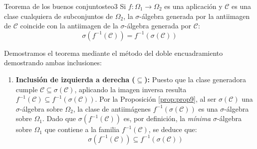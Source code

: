 \begin{teorema}{Teorema de los buenos conjuntos}{teo3}
Si $f: \Omega_1 \to \Omega_2$ es una aplicación y $\mathcal{C}$ es una clase cualquiera de subconjuntos de $\Omega_2$, la $\sigma$-álgebra generada por la antiimagen de $\mathcal{C}$ coincide con la antiimagen de la $\sigma$-álgebra generada por $\mathcal{C}$:
\[
    \sigma(f^{-1}(\mathcal{C})) = f^{-1}(\sigma(\mathcal{C}))
\]
\end{teorema}

\begin{demostracion}
Demostramos el teorema mediante el método del doble encuadramiento demostrando ambas inclusiones:
\begin{enumerate}[label=\arabic*.]
    \item \textbf{Inclusión de izquierda a derecha ($\subseteq$):}
    Puesto que la clase generadora cumple $\mathcal{C} \subseteq \sigma(\mathcal{C})$, aplicando la imagen inversa resulta $f^{-1}(\mathcal{C}) \subseteq f^{-1}(\sigma(\mathcal{C}))$.
    Por la Proposición \ref{prop:prop9}, al ser $\sigma(\mathcal{C})$ una $\sigma$-álgebra sobre $\Omega_2$, la clase de antiimágenes $f^{-1}(\sigma(\mathcal{C}))$ es una $\sigma$-álgebra sobre $\Omega_1$.
    Dado que $\sigma(f^{-1}(\mathcal{C}))$ es, por definición, la \textit{mínima} $\sigma$-álgebra sobre $\Omega_1$ que contiene a la familia $f^{-1}(\mathcal{C})$, se deduce que:
    \[
        \sigma(f^{-1}(\mathcal{C})) \subseteq f^{-1}(\sigma(\mathcal{C}))
    \]


\end{enumerate}
\end{demostracion}
